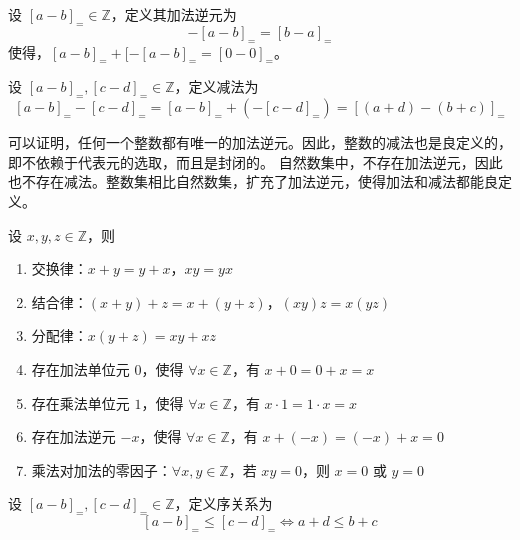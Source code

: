 \vspace{1em}

\begin{definition}
    设 $[a-b]_{=}\in\mathbb{Z}$，定义其加法逆元为
    \[
        -[a-b]_{=} = [b-a]_{=}
    \]
    使得，$[a-b]_{=} + [-[a-b]_{=} = [0-0]_{=}$。
\end{definition}

\begin{definition}
    设 $[a-b]_{=},[c-d]_{=}\in\mathbb{Z}$，定义减法为
    \[
        [a-b]_{=} - [c-d]_{=} = [a-b]_{=} + (-[c-d]_{=}) = [(a+d)-(b+c)]_{=}
    \]
\end{definition}

\begin{note}
    可以证明，任何一个整数都有唯一的加法逆元。因此，整数的减法也是良定义的，即不依赖于代表元的选取，而且是封闭的。
    自然数集中，不存在加法逆元，因此也不存在减法。整数集相比自然数集，扩充了加法逆元，使得加法和减法都能良定义。
\end{note}

\vspace{1em}

\begin{theorem}[整数代数运算的性质]
    设 $x,y,z\in\mathbb{Z}$，则
    \begin{enumerate}
        \item 交换律：$x+y=y+x$，$xy=yx$
        \item 结合律：$(x+y)+z=x+(y+z)$，$(xy)z=x(yz)$
        \item 分配律：$x(y+z)=xy+xz$
        \item 存在加法单位元 $0$，使得 $\forall x\in\mathbb{Z}$，有 $x+0=0+x=x$
        \item 存在乘法单位元 $1$，使得 $\forall x\in\mathbb{Z}$，有 $x\cdot 1 = 1\cdot x = x$
        \item 存在加法逆元 $-x$，使得 $\forall x\in\mathbb{Z}$，有 $x+(-x)=(-x)+x=0$
        \item 乘法对加法的零因子：$\forall x,y\in\mathbb{Z}$，若 $xy=0$，则 $x=0$ 或 $y=0$
    \end{enumerate}
\end{theorem}

\vspace{1em}

\begin{definition}
    设 $[a-b]_{=},[c-d]_{=}\in\mathbb{Z}$，定义序关系为
    \[
        [a-b]_{=} \leq [c-d]_{=} \iff a+d \leq b+c
    \]    
\end{definition}

